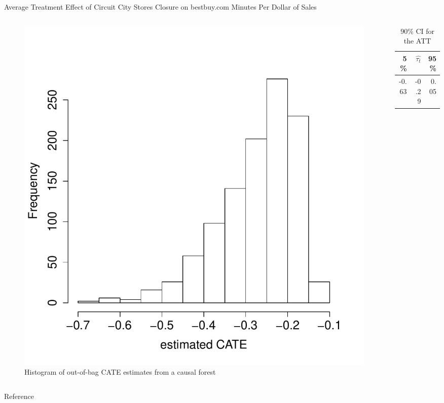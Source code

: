 \documentclass[mathserif, xcolor=table]{beamer}
\begin{document}
\begin{frame}{Average Treatment Effect of Circuit City Stores Closure on bestbuy.com Minutes Per Dollar of Sales}
	\vspace{-1em}
	\begin{columns}
		\begin{column}{.6\textwidth}
			\begin{figure}[h]
				\centering
				\includegraphics[scale=0.3]{pic/tauhat5_bb_hist.pdf}
				\caption{ Histogram of out-of-bag CATE estimates from a causal forest}
				\label{fig:tauhat5_bb_hist}
			\end{figure}
		\end{column}
		
		\begin{column}{.39\textwidth}
			\begin{table}[h]
				\caption{90\% CI for the ATT}
				\centering
				\begin{tabular}{rrr}
					\hline
					5\%  & $\hat{\tau_t}$ & 95\% \\ 
					\hline
					-0.63 & -0.29 & 0.05 \\ 
					\hline
				\end{tabular}
			\end{table}
		\end{column}
	\end{columns}
\end{frame}

\begin{frame}[allowframebreaks]{Reference}
	
	
\end{frame}
\end{document}
